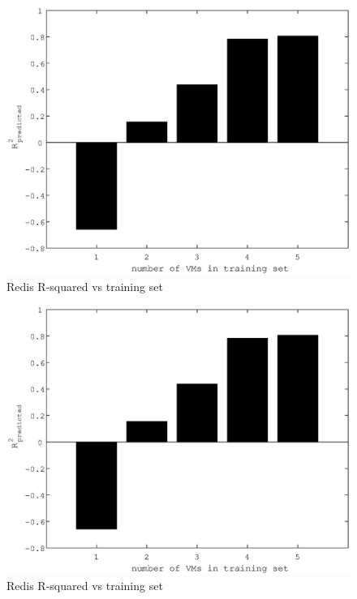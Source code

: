 \documentclass{acm_proc_article-sp}
\begin{document}
\begin{figure}
\centering
\includegraphics[scale = 0.5]{redis_read_bar.eps}
\caption{Redis R-squared vs training set}
\label{figure:redisbarread}
\end{figure}

\begin{figure}
\centering
\includegraphics[scale = 0.5]{redis_read_bar.eps}
\caption{Redis R-squared vs training set}
\label{figure:redisbarread}
\end{figure}
\end{document}
